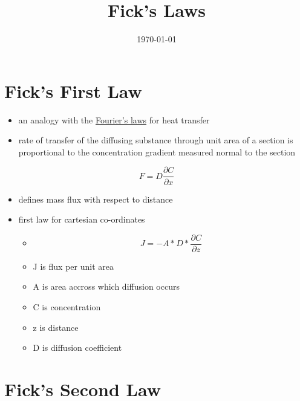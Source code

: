 \documentclass[11pt]{article}
\date{\today}
\title{Fick's Laws}
\begin{document}
\maketitle
\tableofcontents


\section{Fick's First Law}
\label{sec:org1e13411}
\begin{itemize}
\item an analogy with the \href{fourierslaws.org}{Fourier's laws} for heat transfer
\item rate of transfer of the diffusing substance through unit area of a section is proportional to the concentration gradient measured normal to the section
\end{itemize}
\begin{equation}
F = D \frac{\partial C}{\partial x}
\end{equation}
\begin{itemize}
\item defines mass flux with respect to distance
\item first law for cartesian co-ordinates
\begin{itemize}
\item $$J = - A * D * \frac{\partial C}{\partial z}$$
\item J is flux per unit area
\item A is area accross which diffusion occurs
\item C is concentration
\item z is distance
\item D is diffusion coefficient
\end{itemize}
\end{itemize}
\section{Fick's Second Law}
\label{sec:org3bee403}
\end{document}
